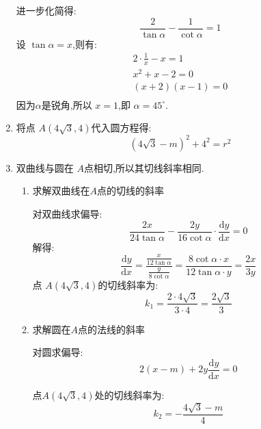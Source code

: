 \begin{questions}
\begin{solution}
\begin{enumerate}[label=\arabic*., noitemsep]
			      进一步化简得:
			      \begin{equation*}
				      \frac{2}{\tan\alpha} - \frac{1}{\cot\alpha} = 1
			      \end{equation*}
			      设 $\tan\alpha=x$,则有:
			      \begin{align*}
				      2\cdot\frac1x - x = 1 \\
				      x^2 +x - 2 = 0        \\
				      (x+2)(x-1) = 0        \\
			      \end{align*}
			      因为$\alpha$是锐角,所以 $x=1$,即 \( \alpha=45^\circ \).
			\item 将点 \( A(4\sqrt{3}, 4) \)代入圆方程得:
			      \begin{equation*}
				      (4\sqrt{3} - m)^2 + 4^2 = r^2 \tag{a}
			      \end{equation*}
			\item 双曲线与圆在 $A$点相切,所以其切线斜率相同.
			      \begin{enumerate}[label=\alph*., noitemsep]
				      \item 求解双曲线在$A$点的切线的斜率

				            对双曲线求偏导:
				            \begin{equation*}
					            \frac{2x}{24\tan\alpha} - \frac{2y}{16\cot\alpha}\cdot\frac{\text{d}y}{\text{d} x} = 0
				            \end{equation*}
				            解得:
				            \begin{equation*}
					            \frac{\text{d}y}{\text{d}x} = \frac{\frac{x}{12\tan\alpha}}{\frac{y}{8\cot\alpha}}
					            = \frac{8\cot\alpha\cdot x}{12\tan\alpha\cdot y} = \frac{2x}{3y}
				            \end{equation*}
				            点 \( A(4\sqrt{3},4) \)的切线斜率为:
				            \begin{equation*}
					            k_1 = \frac{2\cdot4\sqrt{3}}{3\cdot4} =
					            \frac{2\sqrt{3}}{3}
				            \end{equation*}
				      \item 求解圆在$A$点的法线的斜率

				            对圆求偏导:
				            \begin{equation*}
					            2(x-m) + 2y\frac{\text{d}y}{\text{d}x} = 0
				            \end{equation*}

				            点$A(4\sqrt{3},4)$处的切线斜率为:
				            \begin{equation*}
					            k_2 = -\frac{4\sqrt{3} - m}{4}
				            \end{equation*}


\end{enumerate}
\end{enumerate}
\end{solution}
\end{questions}
